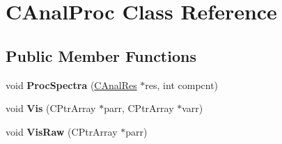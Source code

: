 \hypertarget{class_c_anal_proc}{\section{C\-Anal\-Proc Class Reference}
\label{class_c_anal_proc}
}
\subsection*{Public Member Functions}
\begin{DoxyCompactItemize}
\item 
\hypertarget{class_c_anal_proc_afb8a7d0f459f0775c2eae0311cb204ab}{void {\bfseries Proc\-Spectra} (\hyperlink{class_c_anal_res}{C\-Anal\-Res} $\ast$res, int compcnt)}\label{class_c_anal_proc_afb8a7d0f459f0775c2eae0311cb204ab}

\item 
\hypertarget{class_c_anal_proc_a5b7a21d778e6eaa07828cd888e774508}{void {\bfseries Vis} (C\-Ptr\-Array $\ast$parr, C\-Ptr\-Array $\ast$varr)}\label{class_c_anal_proc_a5b7a21d778e6eaa07828cd888e774508}

\item 
\hypertarget{class_c_anal_proc_a588e84a674101d4264b4af42fe5687c8}{void {\bfseries Vis\-Raw} (C\-Ptr\-Array $\ast$parr)}\label{class_c_anal_proc_a588e84a674101d4264b4af42fe5687c8}

\end{DoxyCompactItemize}
